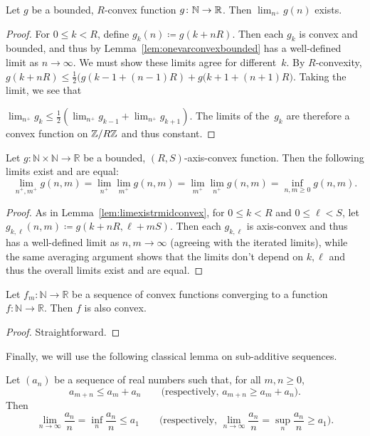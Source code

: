 \begin{lemma}
  Let $g$ be a bounded, $R$-convex function
  $g \colon \mathbb{N} \to \mathbb{R}$. Then $\lim_{n^+} g(n)$ exists.
 \label{lem:limexistrmidconvex}
\end{lemma}
\begin{proof}
  For $0 \le k < R$, define $g_k(n) \coloneqq g(k + nR)$. Then each
  $g_k$ is convex and bounded, and thus by
  Lemma~\ref{lem:onevarconvexbounded} has a well-defined limit as
  $n \to \infty$. We must show these limits agree for different~$k$.
  By $R$-convexity,
  $g(k + nR) \le \frac{1}{2} \bigl(g(k-1 + (n-1)R) + g(k+1 +
  (n+1)R\bigr)$. Taking the limit, we see that

  $\lim_{n^+} g_k \le \frac{1}{2} (\lim_{n^+} g_{k-1} + \lim_{n^+} g_{k+1})$.
  The limits of the~$g_k$ are therefore a convex function on
  $\mathbb{Z}/R\mathbb{Z}$ and thus constant.
\end{proof}
 
\begin{lemma}
  \label{lem:limexistrmidconvextwovar}
  Let $g \colon \mathbb{N} \times \mathbb{N} \to \mathbb{R}$ be a
  bounded, $(R,S)$-axis-convex function. Then the
  following limits exist and are equal:
  \[
    \lim_{n^+,m^+} g(n,m) = \lim_{n^+} \lim_{m^+} g(n,m)
    = \lim_{m^+} \lim_{n^+} g(n,m) = \inf_{n,m \ge 0} g(n,m).
  \]
\end{lemma}

\begin{proof}
  As in Lemma~\ref{lem:limexistrmidconvex}, for $0 \le k < R$ and $0
  \le \ell < S$, let $g_{k,\ell}(n,m) \coloneqq g(k+nR, \ell+mS)$.
  Then each $g_{k,\ell}$ is axis-convex and thus has a well-defined limit
  as $n,m \to \infty$ (agreeing with the iterated limits), while the
  same averaging argument shows that the limits don't depend on
  $k,\ell$ and thus the overall limits exist and are equal.
\end{proof}

 \begin{lemma}
 Let $f_m \colon \mathbb{N} \to \mathbb{R}$ be a sequence of convex functions converging to a  function
 $f \colon \mathbb{N} \to \mathbb{R}$. Then $f$ is also convex.
 \label{lem:limitconvex}
 \end{lemma}

 \begin{proof}
   Straightforward.
 \end{proof}
 
Finally, we will use the following classical lemma on sub-additive sequences.
\begin{lemma}\label{lem:fekete}
Let $(a_n)$ be a sequence of real numbers such that, for all $m,n\ge 0$,
\[
a_{m+n} \le a_m + a_n 
\qquad \text{(respectively, } a_{m+n} \ge a_m + a_n\text{).}
\]
Then
\[
\lim_{n\to\infty} \frac{a_n}{n}
= \inf_{n} \frac{a_n}{n} \le a_1
\qquad \text{(respectively, } 
\lim_{n\to\infty} \frac{a_n}{n}
= \sup_{n} \frac{a_n}{n} \ge a_1\text{).}
\]
\end{lemma}

